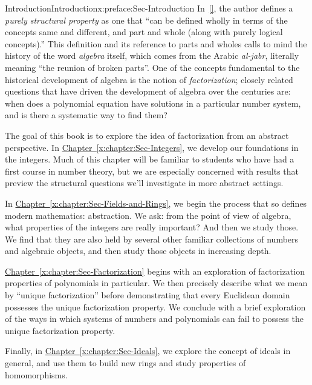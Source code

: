 \documentclass[oneside,10pt,]{book}
\newcommand{\xreffont}{\relax}
\numberwithin{equation}{section}
\begin{document}
\begin{preface}{Introduction}{}{Introduction}{}{}{x:preface:Sec-Introduction}
In~\hyperlink{x:biblio:franklin2014aristotelian}{[{\xreffont 1}]}, the author defines a \emph{purely structural property} as one that ``can be defined wholly in terms of the concepts same and different, and part and whole (along with purely logical concepts).'' This definition and its reference to parts and wholes calls to mind the history of the word \emph{algebra} itself, which comes from the Arabic \emph{al-jabr}, literally meaning ``the reunion of broken parts''. One of the concepts fundamental to the historical development of algebra is the notion of \emph{factorization}; closely related questions that have driven the development of algebra over the centuries are: when does a polynomial equation have solutions in a particular number system, and is there a systematic way to find them?%
\par
The goal of this book is to explore the idea of factorization from an abstract perspective. In \hyperref[x:chapter:Sec-Integers]{Chapter~{\xreffont\ref{x:chapter:Sec-Integers}}}, we develop our foundations in the integers. Much of this chapter will be familiar to students who have had a first course in number theory, but we are especially concerned with results that preview the structural questions we'll investigate in more abstract settings.%
\par
In \hyperref[x:chapter:Sec-Fields-and-Rings]{Chapter~{\xreffont\ref{x:chapter:Sec-Fields-and-Rings}}}, we begin the process that so defines modern mathematics: abstraction. We ask: from the point of view of algebra, what properties of the integers are really important? And then we study those. We find that they are also held by several other familiar collections of numbers and algebraic objects, and then study those objects in increasing depth.%
\par
\hyperref[x:chapter:Sec-Factorization]{Chapter~{\xreffont\ref{x:chapter:Sec-Factorization}}} begins with an exploration of factorization properties of polynomials in particular. We then precisely describe what we mean by ``unique factorization'' before demonstrating that every Euclidean domain possesses the unique factorization property. We conclude with a brief exploration of the ways in which systems of numbers and polynomials can fail to possess the unique factorization property.%
\par
Finally, in \hyperref[x:chapter:Sec-Ideals]{Chapter~{\xreffont\ref{x:chapter:Sec-Ideals}}}, we explore the concept of ideals in general, and use them to build new rings and study properties of homomorphisms.%

\end{preface}
\end{document}
